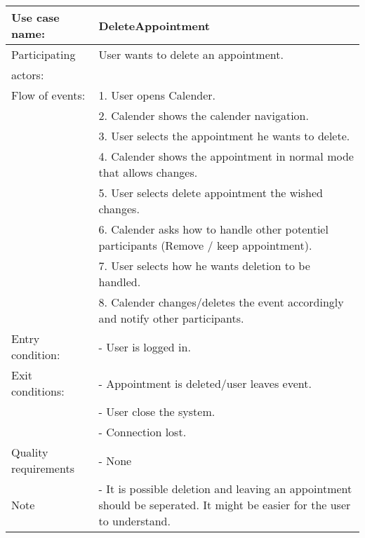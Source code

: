 {\tabulinesep=1.2mm
\begin{tabu}{ | p{3cm} | p{13cm} |}
    \hline
    Use case name: 			& 		DeleteAppointment\\ \hline
    Participating  			& 		User wants to delete an appointment. \\
    actors:					& 		\\ \hline
    Flow of events: 		& 		1. User opens Calender. \\
							&		2. Calender shows the calender navigation.\\
							&		3. User selects the appointment he wants to delete.\\
							&		4. Calender shows the appointment in normal mode that allows changes.\\
							&		5. User selects delete appointment the wished changes.\\
							&		6. Calender asks how to handle other potentiel participants (Remove / keep appointment).\\ 
							&		7. User selects how he wants deletion to be handled.\\ 
							&		8. Calender changes/deletes the event accordingly and notify other participants.\\\hline
    Entry condition: 		& 		- User is logged in.  \\ \hline
	Exit conditions: 		&		- Appointment is deleted/user leaves event.\\
							&		- User close the system.\\
							&		- Connection lost.\\\hline
	Quality requirements	&	 	- None \\\hline
	Note					&		- It is possible deletion and leaving an appointment should be seperated. It might be easier for the user to understand.\\\hline
\end{tabu}
}
